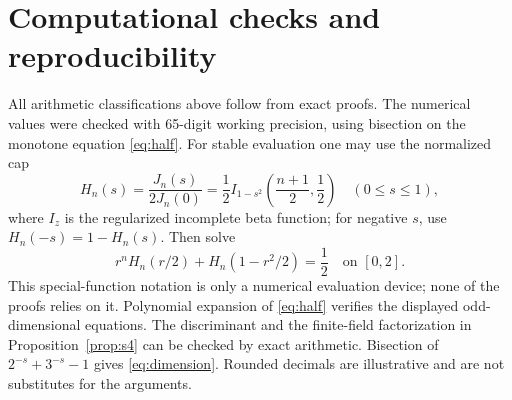 \documentclass[11pt,a4paper]{article}
\numberwithin{equation}{section}
\theoremstyle{definition}
\theoremstyle{remark}
\begin{document}
\appendix
\section{Computational checks and reproducibility}

All arithmetic classifications above follow from exact proofs. The numerical values were checked with 65-digit working precision, using bisection on the monotone equation \eqref{eq:half}. For stable evaluation one may use the normalized cap
\[
 H_n(s)=\frac{J_n(s)}{2J_n(0)}
 =\frac12 I_{1-s^2}\!\left(\frac{n+1}{2},\frac12\right)
 \quad(0\leq s\leq1),
\]
where $I_z$ is the regularized incomplete beta function; for negative $s$, use $H_n(-s)=1-H_n(s)$. Then solve
\[
 r^nH_n(r/2)+H_n(1-r^2/2)=\frac12
 \quad\text{on }[0,2].
\]
This special-function notation is only a numerical evaluation device; none of the proofs relies on it. Polynomial expansion of \eqref{eq:half} verifies the displayed odd-dimensional equations. The discriminant and the finite-field factorization in Proposition~\ref{prop:s4} can be checked by exact arithmetic. Bisection of $2^{-s}+3^{-s}-1$ gives \eqref{eq:dimension}. Rounded decimals are illustrative and are not substitutes for the arguments.
\end{document}
